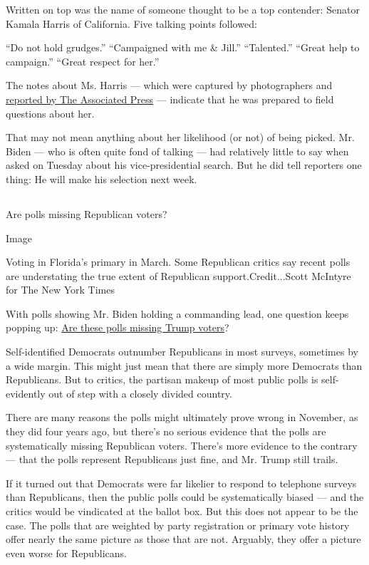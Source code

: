 Written on top was the name of someone thought to be a top contender:
Senator Kamala Harris of California. Five talking points followed:

``Do not hold grudges.'' ``Campaigned with me \& Jill.'' ``Talented.''
``Great help to campaign.'' ``Great respect for her.''

The notes about Ms. Harris --- which were captured by photographers and
\href{https://apnews.com/d3fc8b88cde56bac9f1e7b5e494fb019}{reported by
The Associated Press} --- indicate that he was prepared to field
questions about her.

That may not mean anything about her likelihood (or not) of being
picked. Mr. Biden --- who is often quite fond of talking --- had
relatively little to say when asked on Tuesday about his
vice-presidential search. But he did tell reporters one thing: He will
make his selection next week.

\hypertarget{-9}{%
\subsection{}\label{-9}}

Are polls missing Republican voters?

Image

Voting in Florida's primary in March. Some Republican critics say recent
polls are understating the true extent of Republican
support.Credit...Scott McIntyre for The New York Times

With polls showing Mr. Biden holding a commanding lead, one question
keeps popping up:
\href{https://www.nytimes.com/2020/07/29/upshot/polls-political-party-republicans.html}{Are
these polls missing Trump voters}?

Self-identified Democrats outnumber Republicans in most surveys,
sometimes by a wide margin. This might just mean that there are simply
more Democrats than Republicans. But to critics, the partisan makeup of
most public polls is self-evidently out of step with a closely divided
country.

There are many reasons the polls might ultimately prove wrong in
November, as they did four years ago, but there's no serious evidence
that the polls are systematically missing Republican voters. There's
more evidence to the contrary --- that the polls represent Republicans
just fine, and Mr. Trump still trails.

If it turned out that Democrats were far likelier to respond to
telephone surveys than Republicans, then the public polls could be
systematically biased --- and the critics would be vindicated at the
ballot box. But this does not appear to be the case. The polls that are
weighted by party registration or primary vote history offer nearly the
same picture as those that are not. Arguably, they offer a picture even
worse for Republicans.

